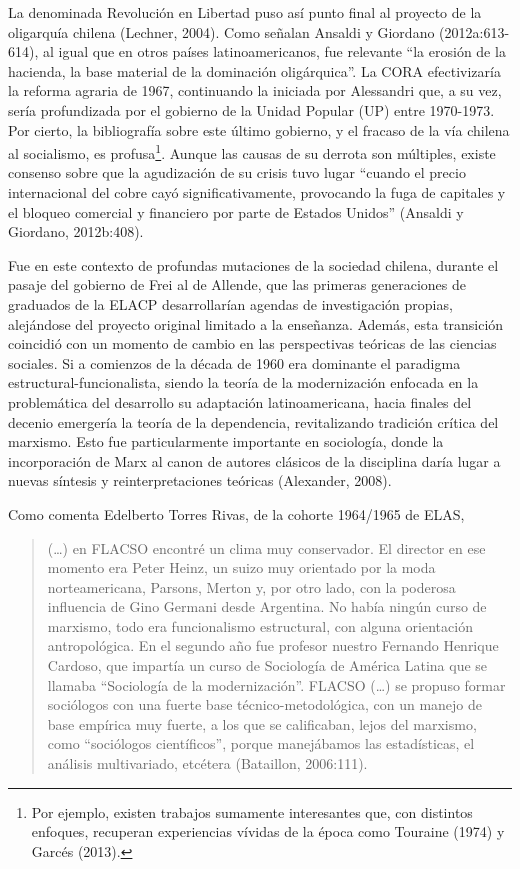 La denominada Revolución en Libertad puso así punto final al proyecto de la oligarquía chilena (Lechner, 2004). Como señalan Ansaldi y Giordano (2012a:613-614), al igual que en otros países latinoamericanos, fue relevante ``la erosión de la hacienda, la base material de la dominación oligárquica''. La CORA efectivizaría la reforma agraria de 1967, continuando la iniciada por Alessandri que, a su vez, sería profundizada por el gobierno de la Unidad Popular (UP) entre 1970-1973. Por cierto, la bibliografía sobre este último gobierno, y el fracaso de la vía chilena al socialismo, es profusa\footnote{Por ejemplo, existen trabajos sumamente interesantes que, con distintos enfoques, recuperan experiencias vívidas de la época como Touraine (1974) y Garcés (2013).}. Aunque las causas de su derrota son múltiples, existe consenso sobre que la agudización de su crisis tuvo lugar ``cuando el precio internacional del cobre cayó significativamente, provocando la fuga de capitales y el bloqueo comercial y financiero por parte de Estados Unidos'' (Ansaldi y Giordano, 2012b:408).

Fue en este contexto de profundas mutaciones de la sociedad chilena, durante el pasaje del gobierno de Frei al de Allende, que las primeras generaciones de graduados de la ELACP desarrollarían agendas de investigación propias, alejándose del proyecto original limitado a la enseñanza. Además, esta transición coincidió con un momento de cambio en las perspectivas teóricas de las ciencias sociales. Si a comienzos de la década de 1960 era dominante el paradigma estructural-funcionalista, siendo la teoría de la modernización enfocada en la problemática del desarrollo su adaptación latinoamericana, hacia finales del decenio emergería la teoría de la dependencia, revitalizando tradición crítica del marxismo. Esto fue particularmente importante en sociología, donde la incorporación de Marx al canon de autores clásicos de la disciplina daría lugar a nuevas síntesis y reinterpretaciones teóricas (Alexander, 2008).

Como comenta Edelberto Torres Rivas, de la cohorte 1964/1965 de ELAS,

\begin{quote}
(\ldots) en FLACSO encontré un clima muy conservador. El director en ese momento era Peter Heinz, un suizo muy orientado por la moda norteamericana, Parsons, Merton y, por otro lado, con la poderosa influencia de Gino Germani desde Argentina. No había ningún curso de marxismo, todo era funcionalismo estructural, con alguna orientación antropológica. En el segundo año fue profesor nuestro Fernando Henrique Cardoso, que impartía un curso de Sociología de América Latina que se llamaba ``Sociología de la modernización''. FLACSO (\ldots) se propuso formar sociólogos con una fuerte base técnico-metodológica, con un manejo de base empírica muy fuerte, a los que se calificaban, lejos del marxismo, como ``sociólogos científicos'', porque manejábamos las estadísticas, el análisis multivariado, etcétera (Bataillon, 2006:111).
\end{quote}

